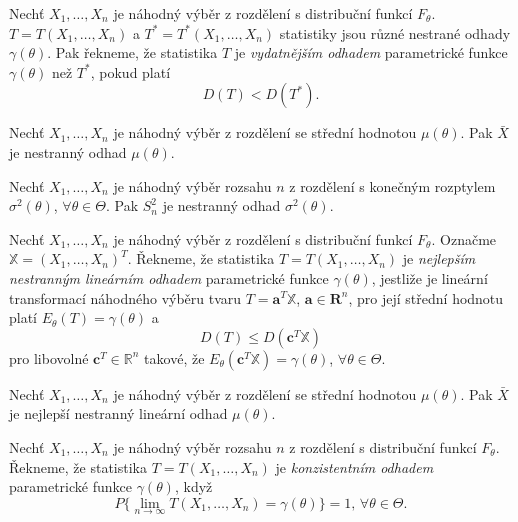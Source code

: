 \begin{definition}
Nechť $X_1,\ldots,X_n$ je náhodný výběr z rozdělení s distribuční funkcí $F_{\theta}$. $T=T \left(X_1,\ldots,X_n \right)$ a $T^{*}=T^{*} \left(X_1,\ldots,X_n \right)$ statistiky jsou různé nestrané odhady $\gamma \left(\theta \right)$. Pak řekneme, že statistika $T$ je \textit{vydatnějším odhadem} parametrické funkce $\gamma \left(\theta \right)$ než $T^{*}$, pokud platí $$D \left( T \right) < D \left( T^{*} \right).$$
\end{definition}

\begin{theorem}
Nechť $X_1,\ldots,X_n$ je náhodný výběr z rozdělení se střední hodnotou $\mu \left(\theta \right)$. Pak $\bar{X}$ je nestranný odhad $\mu \left(\theta \right)$.
\end{theorem}

\begin{theorem}
Nechť $X_1,\ldots,X_n$ je náhodný výběr rozsahu $n$ z rozdělení s konečným rozptylem $\sigma^2 \left(\theta \right)$, $\forall \theta \in \Theta $. Pak $S_{n}^{2}$ je nestranný odhad $\sigma^2 \left(\theta \right)$. 
\end{theorem}

\begin{theorem}
Nechť $X_1,\ldots,X_n$ je náhodný výběr z rozdělení s distribuční funkcí $F_{\theta}$. Označme $\mathbb{X} = \left(X_1,\ldots,X_n \right)^T$. Řekneme, že statistika $T=T \left(X_1,\ldots,X_n \right)$ je \textit{nejlepším nestranným lineárním odhadem} parametrické funkce $\gamma \left(\theta \right)$, jestliže je lineární transformací náhodného výběru tvaru $T = \mathbf{a}^T\mathbb{X}$, $\mathbf{a} \in \mathbf{R}^n$, pro její střední hodnotu platí $E_{\theta} \left(T \right) = \gamma \left(\theta \right)$ a 
$$D \left(T\right) \leq D\left(\mathbf{c}^T \mathbb{X} \right)$$ 
pro libovolné $\mathbf{c}^T \in  \mathbb{R}^n$ takové, že $E_{\theta} \left(\mathbf{c}^T \mathbb{X} \right) = \gamma \left(\theta \right)$, $\forall \theta \in \Theta$. 
\end{theorem}

\begin{theorem}
Nechť $X_1,\ldots,X_n$ je náhodný výběr z rozdělení se střední hodnotou $\mu \left(\theta \right)$. Pak $\bar{X}$ je nejlepší nestranný lineární odhad $\mu \left(\theta \right)$.
\end{theorem}

\begin{definition}
Nechť $X_1,\ldots,X_n$ je náhodný výběr rozsahu $n$ z rozdělení s distribuční funkcí $F_{\theta}$. Řekneme, že statistika $T=T \left(X_1,\ldots,X_n \right)$ je \textit{konzistentním odhadem} parametrické funkce $\gamma \left(\theta \right)$, když $$P\{ \lim_{n \to \infty} T \left(X_1,\ldots,X_n \right) = \gamma \left(\theta \right) \}=1, \, \forall \theta \in \Theta.$$
\end{definition}

